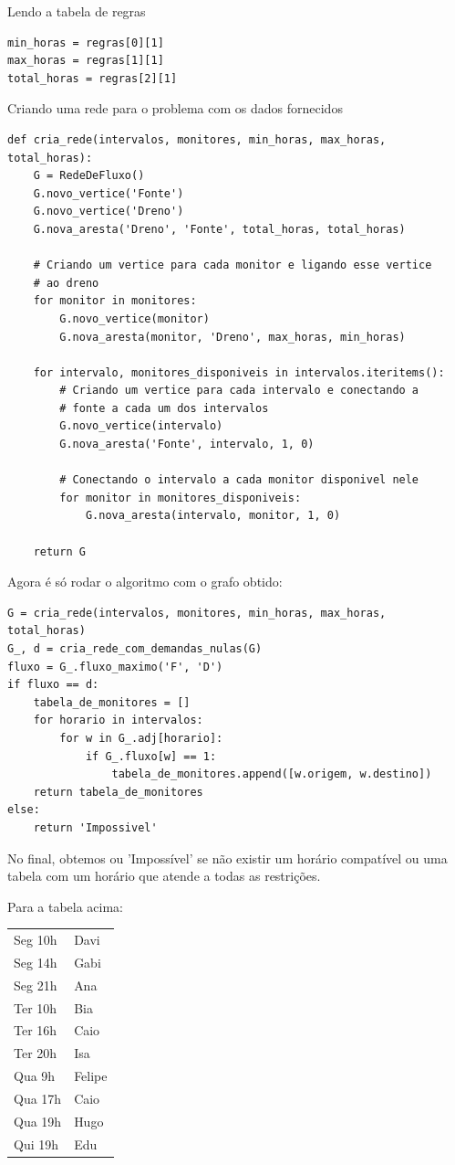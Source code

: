 \documentclass[11pt]{article}
\begin{document}
Lendo a tabela de regras
\begin{verbatim}
min_horas = regras[0][1]
max_horas = regras[1][1]
total_horas = regras[2][1]
\end{verbatim}

Criando uma rede para o problema com os dados fornecidos

\begin{verbatim}
def cria_rede(intervalos, monitores, min_horas, max_horas, total_horas):
    G = RedeDeFluxo()
    G.novo_vertice('Fonte')
    G.novo_vertice('Dreno')
    G.nova_aresta('Dreno', 'Fonte', total_horas, total_horas)

    # Criando um vertice para cada monitor e ligando esse vertice
    # ao dreno
    for monitor in monitores:
        G.novo_vertice(monitor)
        G.nova_aresta(monitor, 'Dreno', max_horas, min_horas)

    for intervalo, monitores_disponiveis in intervalos.iteritems():
        # Criando um vertice para cada intervalo e conectando a
        # fonte a cada um dos intervalos
        G.novo_vertice(intervalo)
        G.nova_aresta('Fonte', intervalo, 1, 0)

        # Conectando o intervalo a cada monitor disponivel nele
        for monitor in monitores_disponiveis:
            G.nova_aresta(intervalo, monitor, 1, 0)

    return G
\end{verbatim}

Agora é só rodar o algoritmo com o grafo obtido:
\begin{verbatim}
G = cria_rede(intervalos, monitores, min_horas, max_horas, total_horas)
G_, d = cria_rede_com_demandas_nulas(G)
fluxo = G_.fluxo_maximo('F', 'D')
if fluxo == d:
    tabela_de_monitores = []
    for horario in intervalos:
        for w in G_.adj[horario]:
            if G_.fluxo[w] == 1:
                tabela_de_monitores.append([w.origem, w.destino])
    return tabela_de_monitores
else:
    return 'Impossivel'
\end{verbatim}

No final, obtemos ou 'Impossível' se não existir um horário compatível
ou uma tabela com um horário que atende a todas as restrições.

Para a tabela acima:
\begin{center}
\begin{tabular}{ll}
Seg 10h & Davi\\
Seg 14h & Gabi\\
Seg 21h & Ana\\
Ter 10h & Bia\\
Ter 16h & Caio\\
Ter 20h & Isa\\
Qua 9h & Felipe\\
Qua 17h & Caio\\
Qua 19h & Hugo\\
Qui 19h & Edu\\
\end{tabular}
\end{center}
\end{document}
